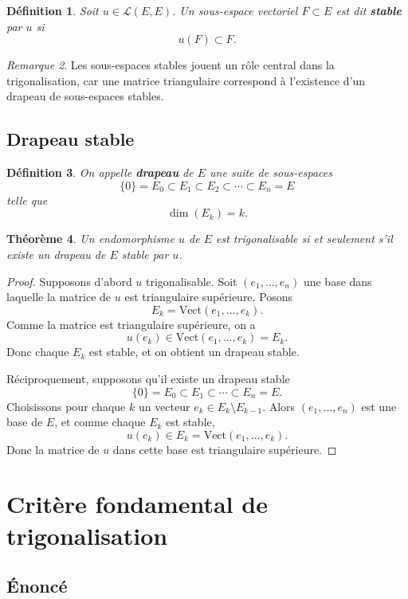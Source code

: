 \documentclass[11pt,a4paper]{article}
\newtheorem{definition}{Définition}[section]
\newtheorem{theoreme}[definition]{Théorème}
\theoremstyle{remark}
\newtheorem{remarque}[definition]{Remarque}
\newcommand{\Vect}{\mathrm{Vect}}
\begin{document}
\begin{definition}
Soit \(u\in\mathcal L(E,E)\).  
Un sous-espace vectoriel \(F\subset E\) est dit \textbf{stable} par \(u\) si
\[
u(F)\subset F.
\]
\end{definition}

\begin{remarque}
Les sous-espaces stables jouent un rôle central dans la trigonalisation, car une matrice triangulaire correspond à l’existence d’un drapeau de sous-espaces stables.
\end{remarque}

\subsection{Drapeau stable}

\begin{definition}
On appelle \textbf{drapeau} de \(E\) une suite de sous-espaces
\[
\{0\}=E_0\subset E_1\subset E_2\subset\cdots\subset E_n=E
\]
telle que
\[
\dim(E_k)=k.
\]
\end{definition}

\begin{theoreme}
Un endomorphisme \(u\) de \(E\) est trigonalisable si et seulement s’il existe un drapeau de \(E\) stable par \(u\).
\end{theoreme}

\begin{proof}
Supposons d’abord \(u\) trigonalisable. Soit \((e_1,\dots,e_n)\) une base dans laquelle la matrice de \(u\) est triangulaire supérieure. Posons
\[
E_k=\Vect(e_1,\dots,e_k).
\]
Comme la matrice est triangulaire supérieure, on a
\[
u(e_k)\in \Vect(e_1,\dots,e_k)=E_k.
\]
Donc chaque \(E_k\) est stable, et on obtient un drapeau stable.

Réciproquement, supposons qu’il existe un drapeau stable
\[
\{0\}=E_0\subset E_1\subset\cdots\subset E_n=E.
\]
Choisissons pour chaque \(k\) un vecteur \(e_k\in E_k\setminus E_{k-1}\). Alors \((e_1,\dots,e_n)\) est une base de \(E\), et comme chaque \(E_k\) est stable,
\[
u(e_k)\in E_k=\Vect(e_1,\dots,e_k).
\]
Donc la matrice de \(u\) dans cette base est triangulaire supérieure.
\end{proof}

\section{Critère fondamental de trigonalisation}

\subsection{Énoncé}
\end{document}

